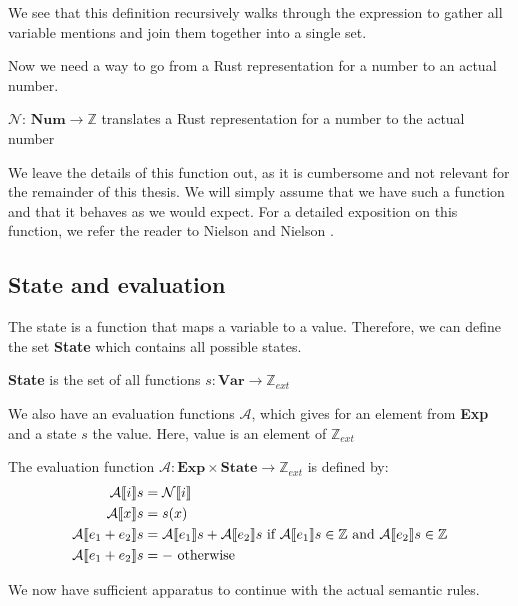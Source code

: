 We see that this definition recursively walks through the expression to gather all variable mentions and join them together into a single set. 

Now we need a way to go from a Rust representation for a number to an actual number.

\begin{definition}
$\mathcal{N}$: $\textbf{Num} \to \mathbb{Z}$ translates a Rust representation for a number to the actual number
\end{definition}

We leave the details of this function out, as it is cumbersome and not relevant for the remainder of this thesis. We will simply assume that we have such a function and that it behaves as we would expect. For a detailed exposition on this function, we refer the reader to Nielson and Nielson \cite{nielson1992semantics}. 

\subsection*{State and evaluation}
The state is a function that maps a variable to a value. Therefore, we can define the set \textbf{State} which contains all possible states. 

\begin{definition}
\textbf{State} is the set of all functions $s: \textbf{Var} \to \mathbb{Z}_{ext}$
\end{definition}

We also have an evaluation functions $\mathcal{A}$, which gives for an element from \textbf{Exp} and a state $s$ the value. Here, value is an element of $\mathbb{Z}_{ext}$

\begin{definition}
The evaluation function $\mathcal{A}: \textbf{Exp} \times \textbf{State} \to \mathbb{Z}_{ext}$ is defined by:
\begin{align*}
    \mathcal{A} \llbracket i \rrbracket s          &= \mathcal{N} \llbracket i \rrbracket
\\  \mathcal{A} \llbracket x \rrbracket s          &= s(x)
\\  \mathcal{A} \llbracket e_1 + e_2 \rrbracket s  &= \mathcal{A} \llbracket e_1 \rrbracket s + \mathcal{A} \llbracket e_2 \rrbracket s \textrm{ if } \mathcal{A} \llbracket e_1 \rrbracket s \in \mathbb{Z} \textrm{ and } \mathcal{A} \llbracket e_2 \rrbracket s \in \mathbb{Z}
\\  \mathcal{A} \llbracket e_1 + e_2 \rrbracket s  &= - \textrm{ otherwise}
\end{align*}
\end{definition}

We now have sufficient apparatus to continue with the actual semantic rules. 

